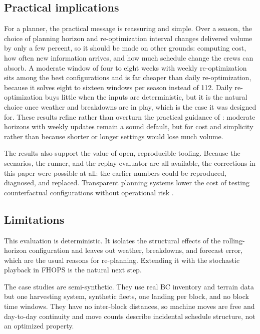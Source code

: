 \subsection{Practical implications}

For a planner, the practical message is reassuring and simple. Over a season, the choice of
planning horizon and re-optimization interval changes delivered volume by only a few percent, so it
should be made on other grounds: computing cost, how often new information arrives, and how much
schedule change the crews can absorb. A moderate window of four to eight weeks with weekly
re-optimization sits among the best configurations and is far cheaper than daily re-optimization,
because it solves eight to sixteen windows per season instead of 112. Daily re-optimization buys
little when the inputs are deterministic, but it is the natural choice once weather and breakdowns
are in play, which is the case it was designed for. These results refine rather than overturn the
practical guidance of \citet{jaffray2026thesis}: moderate horizons with weekly updates remain a
sound default, but for cost and simplicity rather than because shorter or longer settings would
lose much volume.

The results also support the value of open, reproducible tooling. Because the scenarios, the
runner, and the replay evaluator are all available, the corrections in this paper were possible at
all: the earlier numbers could be reproduced, diagnosed, and replaced. Transparent planning systems
lower the cost of testing counterfactual configurations without operational risk
\citep{de2023perceptions}.

\subsection{Limitations}
This evaluation is deterministic. It isolates the structural effects of the rolling-horizon
configuration and leaves out weather, breakdowns, and forecast error, which are the usual reasons
for re-planning. Extending it with the stochastic playback in FHOPS is the natural next step.

The case studies are semi-synthetic. They use real BC inventory and terrain data but one
harvesting system, synthetic fleets, one landing per block, and no block time windows. They have
no inter-block distances, so machine moves are free and day-to-day continuity and move counts describe
incidental schedule structure, not an optimized property.

